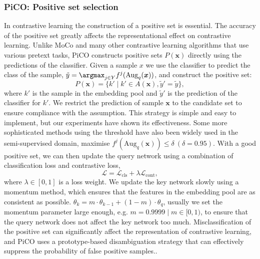 \documentclass{article} %
\begin{document}
\subsubsection{PiCO: Positive set selection}
In contrastive learning the construction of a positive set is essential. The accuracy of the positive set greatly affects the representational effect on contrastive learning. Unlike MoCo and many other contrastive learning algorithms that use various pretext tasks, PiCO constructs positive sets $P(\boldsymbol{x})$ directly using the predictions of the classifier\citep{KaimingHe2019MomentumCF,MangYe2019UnsupervisedEL}.
Given a sample $x$ we use the classifier to predict the class of the sample, $\tilde{y} = \argmax_{j\in Y} f^j(\text{Aug}_q(\boldsymbol{x}))$, and construct the positive set:
\begin{equation}
    P(\boldsymbol{x}) = \{k' \mid k' \in A(\boldsymbol{x}), \tilde{y}' = \tilde{y} \},
\end{equation}
where $k'$ is the sample in the embedding pool and $\tilde{y}'$ is the prediction of the classifier for $k'$.
We restrict the prediction of sample $\boldsymbol{x}$ to the candidate set to ensure compliance with the assumption.
This strategy is simple and easy to implement, but our experiments have shown its effectiveness. Some more sophisticated methods using the threshold have also been widely used in the semi-supervised domain, maximise $f^j(\text{Aug}_q(\boldsymbol{x})) \le \delta ~(\delta = 0.95)$\citep{KihyukSohn2022FixMatchSS}.
With a good positive set, we can then update the query network using a combination of classification loss and contrastive loss,
\begin{equation}
    \mathcal{L} = \mathcal{L}_{\text{cls}} + \lambda\mathcal{L}_{\text{cont}},
\end{equation}
where $\lambda \in [0, 1]$ is a loss weight. We update the key network slowly using a momentum method, which ensures that the features in the embedding pool are as consistent as possible.
$\theta_k = m\cdot\theta_{k-1} + (1-m)\cdot \theta_q$, usually we set the momentum parameter large enough, e.g. $m = 0.9999 \mid m \in [0, 1)$, to ensure that the query network does not affect the key network too much.
Misclassification of the positive set can significantly affect the representation of contrastive learning, and PiCO uses a prototype-based disambiguation strategy that can effectively suppress the probability of false positive samples.\citep{HaoboWang2022PiCOCL}.
\end{document}
